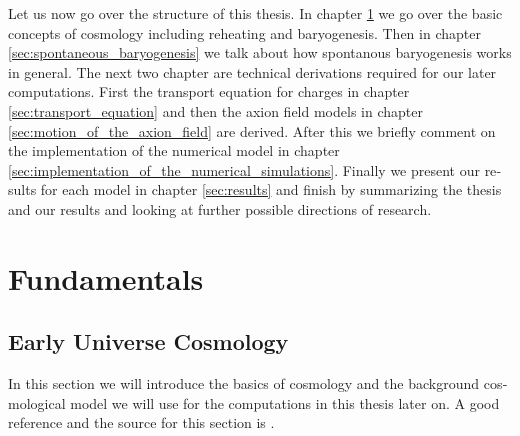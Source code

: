\documentclass[master,       %
               twoside,        %
               BCOR10mm,       %
               english,ngerman, %
               ]{GAUBM}
\begin{document}
\begin{otherlanguage}{english}
Let us now go over the structure of this thesis.
In chapter \ref{sec:fundermentals} we go over the basic concepts of cosmology including reheating and baryogenesis.
Then in chapter \ref{sec:spontaneous_baryogenesis} we talk about how spontanous baryogenesis works in general.
The next two chapter are technical derivations required for our later computations. First the transport equation for charges in chapter \ref{sec:transport_equation} and then the axion field models in chapter \ref{sec:motion_of_the_axion_field} are derived.
After this we briefly comment on the implementation of the numerical model in chapter \ref{sec:implementation_of_the_numerical_simulations}.
Finally we present our results for each model in chapter \ref{sec:results}
and finish by summarizing the thesis and our results and looking at further possible directions of research.

\chapter{Fundamentals}
\label{sec:fundermentals}

\section{Early Universe Cosmology}
In this section we will introduce the basics of cosmology and the background cosmological model we will use for the computations in this thesis later on.
A good reference and the source for this section is \cite{the_early_universe_kolb_and_turner}.


\end{otherlanguage}
\end{document}
